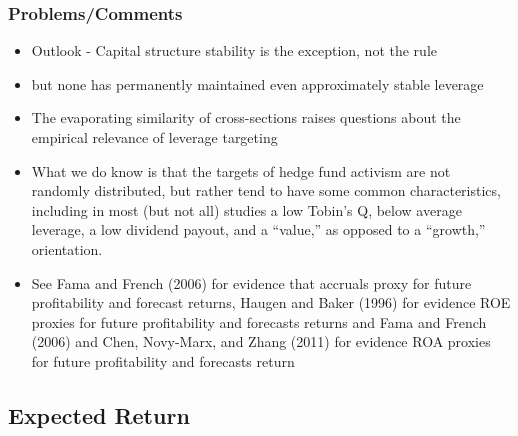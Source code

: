 \documentclass[12pt]{article}
\begin{document}
    \subsubsection{Problems/Comments}

        \begin{itemize}

            \item Outlook - Capital structure stability is the exception, not the rule \citep{Deangelo2015}

            \item but none has permanently maintained even approximately stable leverage \citep{Deangelo2015}

            \item The evaporating similarity of cross-sections raises questions about the empirical relevance of leverage targeting \citep{Deangelo2015}

            \item What we do know is that the targets of hedge fund activism are not randomly distributed, but rather tend to have some common characteristics, including in most (but not all) studies a low Tobin’s Q, below average leverage, a low dividend payout, and a “value,” as opposed to a “growth,” orientation. \citep{CoffeeJr.2014}


            \item See Fama and French (2006) for evidence that accruals proxy for future profitability and forecast returns, Haugen and Baker (1996) for evidence ROE proxies for future profitability and forecasts returns and Fama and French (2006) and Chen, Novy-Marx, and Zhang (2011) for evidence ROA proxies for future profitability and forecasts return \citep{Choi2012}
            
        \end{itemize}


\subsection{Expected Return}    
\end{document}

